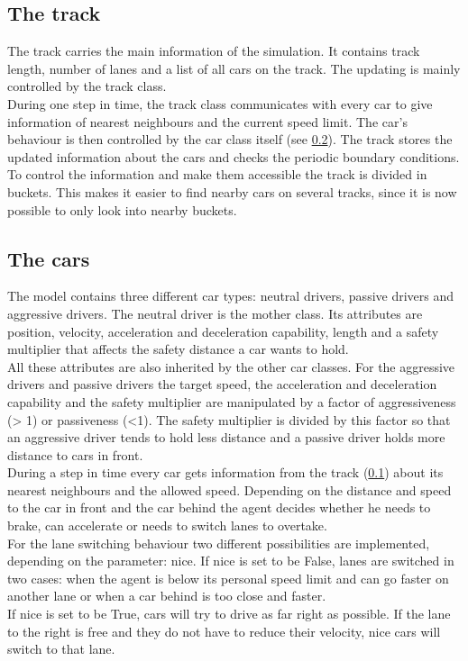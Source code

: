 \documentclass[12pt,a4paper]{article}
\begin{document}
\subsection{The track}\label{track}
The track carries the main information of the simulation. It contains track length, number of lanes and a list of all cars on the track. The updating is mainly controlled by the track class.  \\
During one step in time, the track class communicates with every car to give information of nearest neighbours and the current speed limit. The car's behaviour is then controlled by the car class itself (see \ref{cars}). The track stores the updated information about the cars and checks the periodic boundary conditions. \\
To control the information and make them accessible the track is divided in buckets. This makes it easier to find nearby cars on several tracks, since it is now possible to only look into nearby buckets.

\subsection{The cars} \label{cars}
The model contains three different car types: neutral drivers, passive drivers and aggressive drivers. The neutral driver is the mother class. Its attributes are position, velocity, acceleration and deceleration capability, length and a safety multiplier that affects the safety distance a car wants to hold. \\
All these attributes are also inherited by the other car classes. For the aggressive drivers and passive drivers the target speed, the acceleration and deceleration capability and the safety multiplier are manipulated by a factor of aggressiveness (> 1) or passiveness (<1). The safety multiplier is divided by this factor so that an aggressive driver tends to hold less distance and a passive driver holds more distance to cars in front. \\
During a step in time every car gets information from the track (\ref{track}) about its nearest neighbours and the allowed speed. Depending on the distance and speed to the car in front and the car behind the agent decides whether he needs to brake, can accelerate or needs to switch lanes to overtake. \\
For the lane switching behaviour two different possibilities are implemented, depending on the parameter: nice. If nice is set to be False, lanes are switched in two cases: when the agent is below its personal speed limit and can go faster on another lane or when a car behind is too close and faster.\\
If nice is set to be True, cars will try to drive as far right as possible. If the lane to the right is free and they do not have to reduce their velocity, nice cars will switch to that lane. 
\end{document}
